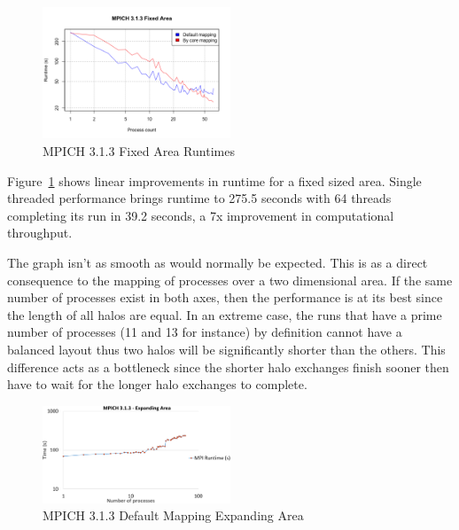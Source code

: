 \begin{figure}
    \includegraphics[page=1,width=0.5\textwidth]
    {graphs/MPICH313-fixed-area.png}
    \caption{MPICH 3.1.3 Fixed Area Runtimes}
    \label{fig:mpichdfixedarea}
\end{figure}

Figure~\ref{fig:mpichdfixedarea} shows linear improvements in runtime for a
fixed sized area. Single threaded performance brings runtime to 275.5 seconds
with 64 threads completing its run in 39.2 seconds, a 7x improvement in
computational throughput.

The graph isn't as smooth as would normally be expected. This is as a direct
consequence to the mapping of processes over a two dimensional area. If the same
number of processes exist in both axes, then the performance is at its best
since the length of all halos are equal. In an extreme case, the runs that have
a prime number of processes (11 and 13 for instance) by definition cannot have a
balanced layout thus two halos will be significantly shorter than the others.
This difference acts as a bottleneck since the shorter halo exchanges finish
sooner then have to wait for the longer halo exchanges to complete.

\begin{figure}
    \includegraphics[page=1,width=0.5\textwidth]
    {graphs/MPICH313-default-mapping-expanding-area-crop.pdf}
    \caption{MPICH 3.1.3 Default Mapping Expanding Area}
    \label{fig:mpichdefaultmappingexpandingarea}
\end{figure}

